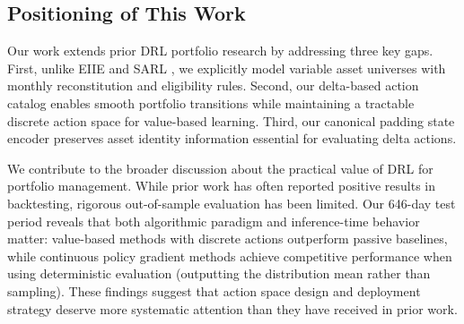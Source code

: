 \subsection{Positioning of This Work}
\label{subsec:positioning}

Our work extends prior DRL portfolio research by addressing three key gaps. First, unlike EIIE \cite{jiang2017eIIE} and SARL \cite{ye2020sarl}, we explicitly model variable asset universes with monthly reconstitution and eligibility rules. Second, our delta-based action catalog enables smooth portfolio transitions while maintaining a tractable discrete action space for value-based learning. Third, our canonical padding state encoder preserves asset identity information essential for evaluating delta actions.

We contribute to the broader discussion about the practical value of DRL for portfolio management. While prior work has often reported positive results in backtesting, rigorous out-of-sample evaluation has been limited. Our 646-day test period reveals that both algorithmic paradigm and inference-time behavior matter: value-based methods with discrete actions outperform passive baselines, while continuous policy gradient methods achieve competitive performance when using deterministic evaluation (outputting the distribution mean rather than sampling). These findings suggest that action space design and deployment strategy deserve more systematic attention than they have received in prior work.
